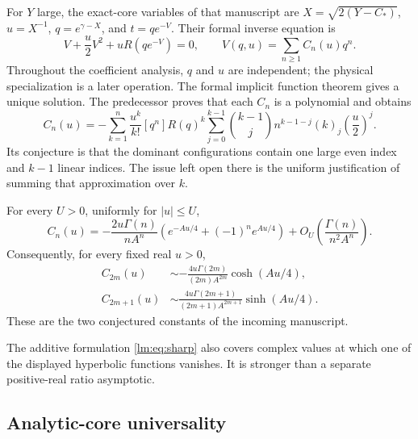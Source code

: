 For $Y$ large, the exact-core variables of that manuscript are
$X=\sqrt{2(Y-C_*)}$, $u=X^{-1}$, $q=e^{\gamma-X}$, and $t=qe^{-V}$.
Their formal inverse equation is
\begin{equation}\label{lm:eq:inverse}
 V+\frac u2V^2+uR(qe^{-V})=0,
 \qquad V(q,u)=\sum_{n\geq1}C_n(u)q^n.
\end{equation}
Throughout the coefficient analysis, $q$ and $u$ are independent; the
physical specialization is a later operation.  The formal implicit
function theorem gives a unique solution.  The predecessor proves that
each $C_n$ is a polynomial and obtains
\begin{equation}\label{lm:eq:finite}
 C_n(u)=-\sum_{k=1}^n\frac{u^k}{k!}[q^n]R(q)^k
 \sum_{j=0}^{k-1}\binom{k-1}{j}n^{k-1-j}(k)_j\left(\frac u2\right)^j.
\end{equation}
Its conjecture is that the dominant configurations contain one large
even index and $k-1$ linear indices.  The issue left open there is the
uniform justification of summing that approximation over $k$.

\begin{theorem}\label{lm:thm:sharp}
For every $U>0$, uniformly for $|u|\leq U$,
\begin{equation}\label{lm:eq:sharp}
 C_n(u)=-\frac{2u\Gamma(n)}{nA^n}
 \left(e^{-Au/4}+(-1)^ne^{Au/4}\right)
 +O_U\!\left(\frac{\Gamma(n)}{n^2A^n}\right).
\end{equation}
Consequently, for every fixed real $u>0$,
\begin{align}
 C_{2m}(u)&\sim-\frac{4u\Gamma(2m)}{(2m)A^{2m}}
                         \cosh(Au/4),\label{lm:eq:even}\\
 C_{2m+1}(u)&\sim\frac{4u\Gamma(2m+1)}{(2m+1)A^{2m+1}}
                         \sinh(Au/4).\label{lm:eq:odd}
\end{align}
These are the two conjectured constants of the incoming manuscript.
\end{theorem}

The additive formulation \eqref{lm:eq:sharp} also covers complex values
at which one of the displayed hyperbolic functions vanishes.  It is
stronger than a separate positive-real ratio asymptotic.

\subsection{Analytic-core universality}
\label{lm:subsec:universality}

